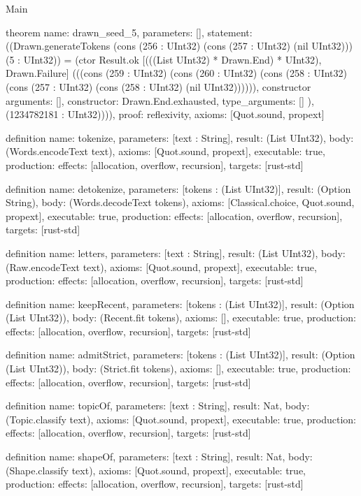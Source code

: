 \begin{lexlean}{Main}
\begin{semanticmodule}
theorem{
  name: drawn_seed_5,
  parameters: [],
  statement: ((Drawn.generateTokens (cons (256 : UInt32) (cons (257 : UInt32) (nil UInt32))) (5 : UInt32)) = (ctor Result.ok [(((List UInt32) * Drawn.End) * UInt32), Drawn.Failure] (((cons (259 : UInt32) (cons (260 : UInt32) (cons (258 : UInt32) (cons (257 : UInt32) (cons (258 : UInt32) (nil UInt32)))))), constructor{
    arguments: [],
    constructor: Drawn.End.exhausted,
    type_arguments: []
  }), (1234782181 : UInt32)))),
  proof: reflexivity{},
  axioms: [Quot.sound, propext]
}

definition{
  name: tokenize,
  parameters: [text : String],
  result: (List UInt32),
  body: (Words.encodeText text),
  axioms: [Quot.sound, propext],
  executable: true,
  production: {effects: [allocation, overflow, recursion], targets: [rust-std]}
}

definition{
  name: detokenize,
  parameters: [tokens : (List UInt32)],
  result: (Option String),
  body: (Words.decodeText tokens),
  axioms: [Classical.choice, Quot.sound, propext],
  executable: true,
  production: {effects: [allocation, overflow, recursion], targets: [rust-std]}
}

definition{
  name: letters,
  parameters: [text : String],
  result: (List UInt32),
  body: (Raw.encodeText text),
  axioms: [Quot.sound, propext],
  executable: true,
  production: {effects: [allocation, overflow, recursion], targets: [rust-std]}
}

definition{
  name: keepRecent,
  parameters: [tokens : (List UInt32)],
  result: (Option (List UInt32)),
  body: (Recent.fit tokens),
  axioms: [],
  executable: true,
  production: {effects: [allocation, overflow, recursion], targets: [rust-std]}
}

definition{
  name: admitStrict,
  parameters: [tokens : (List UInt32)],
  result: (Option (List UInt32)),
  body: (Strict.fit tokens),
  axioms: [],
  executable: true,
  production: {effects: [allocation, overflow, recursion], targets: [rust-std]}
}

definition{
  name: topicOf,
  parameters: [text : String],
  result: Nat,
  body: (Topic.classify text),
  axioms: [Quot.sound, propext],
  executable: true,
  production: {effects: [allocation, overflow, recursion], targets: [rust-std]}
}

definition{
  name: shapeOf,
  parameters: [text : String],
  result: Nat,
  body: (Shape.classify text),
  axioms: [Quot.sound, propext],
  executable: true,
  production: {effects: [allocation, overflow, recursion], targets: [rust-std]}
}


\end{semanticmodule}
\end{lexlean}
